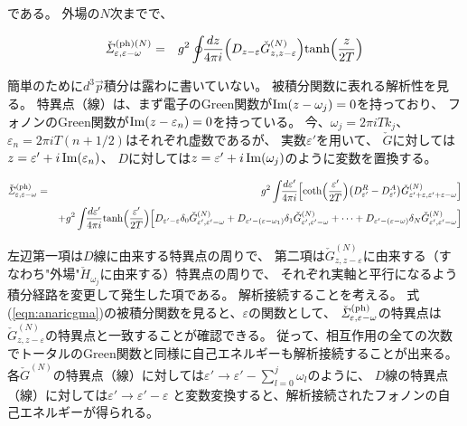 \documentclass[uplatex,a4j,12pt,dvipdfmx]{jsarticle}
\begin{document}
である。
外場の$N$次までで、


\begin{eqnarray}
	\check{\mathit{\Sigma}}^{({\rm ph})(N)}_{\varepsilon , \varepsilon - \omega}
	&=&
	g^{2} \oint \!\! \dfrac{d z}{4 \pi i}
	\Big( D_{z - \varepsilon} \check{G}_{z,z-\varepsilon}^{(N)} \Big)
	{\rm tanh} \Big( \dfrac{z}{2T} \Big)
\end{eqnarray}

簡単のために$d^{3} \vec{p}$積分は露わに書いていない。
被積分関数に表れる解析性を見る。
特異点（線）は、まず電子のGreen関数が${\rm Im}(z - \omega_{j})=0$を持っており、
フォノンのGreen関数が${\rm Im}(z - \varepsilon_{n})=0$を持っている。
今、$\omega_{j} = 2 \pi i T k_{j}$、$\varepsilon_{n} = 2 \pi i T (n + 1/2)$はそれぞれ虚数であるが、
実数$\varepsilon'$を用いて、
$\check{G}$に対しては$z= \varepsilon' + i \ \! {\rm Im} (\varepsilon_{n})$、
$D$に対しては$z= \varepsilon' + i \ \! {\rm Im} (\omega_{j})$のように変数を置換する。

\begin{eqnarray}
	\check{\mathit{\Sigma}}^{(\rm ph)}_{\varepsilon , \varepsilon - \omega}
	&=&
	g^{2} \int \!\! \dfrac{d \varepsilon'}{4 \pi i}
	\Big[
		{\rm coth} \Big( \dfrac{\varepsilon'}{2T} \Big)
		\big( D^{R}_{\varepsilon'} - D^{A}_{\varepsilon'} \big)
		\check{G}_{ \varepsilon' + \varepsilon , \varepsilon' + \varepsilon - \omega }^{(N)} \Big]
	\nonumber \\ && +
	g^{2} \int \!\! \dfrac{d \varepsilon'}{4 \pi i}
	{\rm tanh} \Big( \dfrac{\varepsilon'}{2T} \Big)
	\Big[
		D_{\varepsilon' - \varepsilon} \delta_{0} \check{G}^{(N)}_{\varepsilon' , \varepsilon' - \omega}
		+
		D_{\varepsilon' - (\varepsilon - \omega_{1})} \delta_{1} \check{G}^{(N)}_{\varepsilon' , \varepsilon' - \omega}
		+ \cdots +
		D_{\varepsilon' - (\varepsilon - \omega)} \delta_{N} \check{G}^{(N)}_{\varepsilon' , \varepsilon' - \omega}
		\Big]
	\label{eqn:anaricgma}
\end{eqnarray}

左辺第一項は$D$線に由来する特異点の周りで、
第二項は$\check{G}_{z,z-\varepsilon}^{(N)}$に由来する（すなわち"外場"$\check{H}_{\omega_{j}}$に由来する）特異点の周りで、
それぞれ実軸と平行になるよう積分経路を変更して発生した項である。
解析接続することを考える。
式(\ref{eqn:anaricgma})の被積分関数を見ると、$\varepsilon$の関数として、
$\check{\mathit{\Sigma}}^{(\rm ph)}_{\varepsilon , \varepsilon - \omega}$の特異点は
$\check{G}_{z,z-\varepsilon}^{(N)}$の特異点と一致することが確認できる。
従って、相互作用の全ての次数でトータルのGreen関数と同様に自己エネルギーも解析接続することが出来る。
各$\check{G}^{(N)}$の特異点（線）に対しては$\displaystyle \varepsilon' \to \varepsilon' - \sum_{l=0}^{j} \omega_{l}$のように、
$D$線の特異点（線）に対しては$\displaystyle \varepsilon' \to \varepsilon' - \varepsilon$
と変数変換すると、解析接続されたフォノンの自己エネルギーが得られる。
\end{document}
